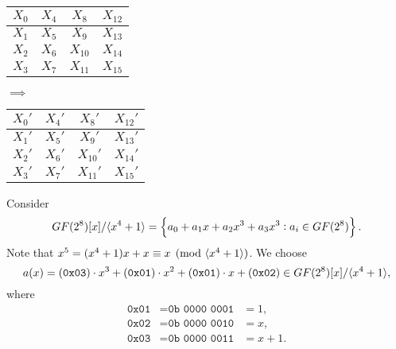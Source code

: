 \begin{center}
	\begin{minipage}{.4\textwidth}\centering
		\begin{tabular}{|c|c|c|c|}
			\hline
			\cellcolor{red!20}$X_0$ & \cellcolor{green!20}$X_4$ & \cellcolor{blue!20}$X_8$ & \cellcolor{yellow!20}$X_{12}$ \\ \hline
			\cellcolor{red!20}$X_1$ & \cellcolor{green!20}$X_5$ & \cellcolor{blue!20}$X_9$ & \cellcolor{yellow!20}$X_{13}$ \\ \hline
			\cellcolor{red!20}$X_2$ & \cellcolor{green!20}$X_6$ & \cellcolor{blue!20}$X_{10}$ & \cellcolor{yellow!20}$X_{14}$ \\ \hline
			\cellcolor{red!20}$X_3$ & \cellcolor{green!20}$X_7$ & \cellcolor{blue!20}$X_{11}$ & \cellcolor{yellow!20}$X_{15}$ \\ \hline
		\end{tabular}
	\end{minipage}$\implies$\begin{minipage}{.4\textwidth}\centering
		\begin{tabular}{|c|c|c|c|}
			\hline
			\cellcolor{red!20}$X_0'$ & \cellcolor{green!20}$X_4'$ & \cellcolor{blue!20}$X_8'$ & \cellcolor{yellow!20}$X_{12}'$ \\ \hline
			\cellcolor{red!20}$X_1'$ & \cellcolor{green!20}$X_5'$ & \cellcolor{blue!20}$X_9'$ & \cellcolor{yellow!20}$X_{13}'$ \\ \hline
			\cellcolor{red!20}$X_2'$ & \cellcolor{green!20}$X_6'$ & \cellcolor{blue!20}$X_{10}'$ & \cellcolor{yellow!20}$X_{14}'$ \\ \hline
			\cellcolor{red!20}$X_3'$ & \cellcolor{green!20}$X_7'$ & \cellcolor{blue!20}$X_{11}'$ & \cellcolor{yellow!20}$X_{15}'$ \\ \hline
		\end{tabular}
	\end{minipage}
\end{center}
Consider
\[
GF(2^8)[x]/\langle x^4+1 \rangle=\set{a_0+a_1x+a_2x^3+a_3x^3: a_i\in GF(2^8)}.
\] Note that $x^5=(x^4+1)x+x\equiv x\pmod{\langle x^4+1 \rangle}$.
We choose \[
a(x)=(\texttt{0x03})\cdot x^3 + (\texttt{0x01})\cdot x^2 + (\texttt{0x01})\cdot x + (\texttt{0x02})\in GF(2^8)[x]/\langle x^4+1 \rangle,
\] where \begin{align*}
	\texttt{0x01} &=\texttt{0b\ 0000\ 0001} &= 1,\\
	\texttt{0x02} &=\texttt{0b\ 0000\ 0010} &= x,\\
	\texttt{0x03} &=\texttt{0b\ 0000\ 0011} &= x+1.
\end{align*}
